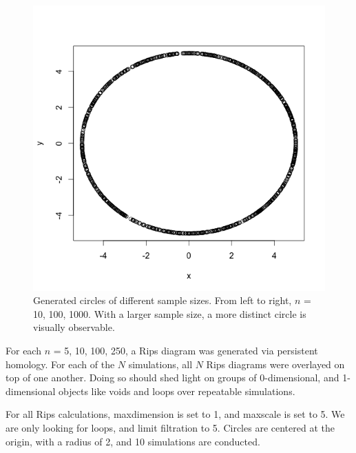 \documentclass[12pt]{article}
\begin{document}
\begin{figure}[!htb]
  \endminipage\hfill
    \includegraphics[width=0.85\linewidth]{circle1000.png}
  \endminipage\hfill
  \caption{Generated circles of different sample sizes. From left to right, $n$ = 10, 100, 1000. With a larger sample size, a more distinct circle is visually observable.}
\end{figure}

For each $n$ = 5, 10, 100, 250, a Rips diagram was generated via persistent homology. For each of the $N$ simulations, all $N$ Rips diagrams were overlayed on top of one another. Doing so should shed light on groups of 0-dimensional, and 1-dimensional objects like voids and loops over repeatable simulations. 

For all Rips calculations, maxdimension is set to 1, and maxscale is set to 5. We are only looking for loops, and limit filtration to 5. Circles are centered at the origin, with a radius of 2, and 10 simulations are conducted. 
\end{document}
